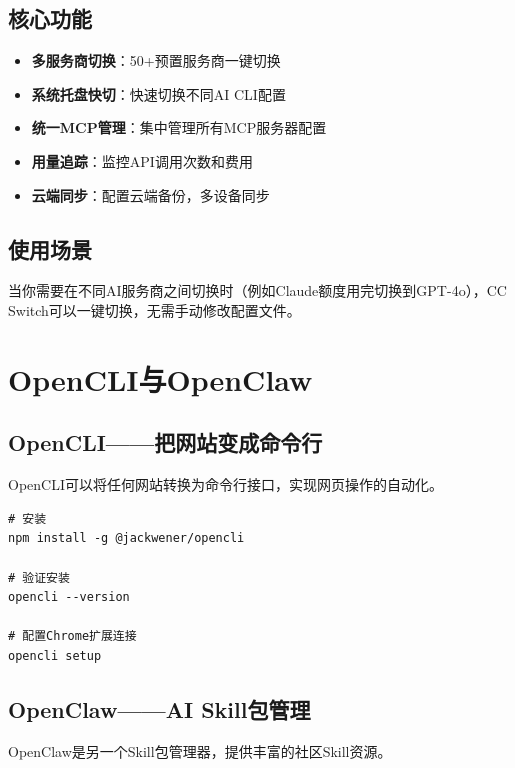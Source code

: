 \subsection{核心功能}

\begin{itemize}
  \item \textbf{多服务商切换}：50+预置服务商一键切换
  \item \textbf{系统托盘快切}：快速切换不同AI CLI配置
  \item \textbf{统一MCP管理}：集中管理所有MCP服务器配置
  \item \textbf{用量追踪}：监控API调用次数和费用
  \item \textbf{云端同步}：配置云端备份，多设备同步
\end{itemize}

\subsection{使用场景}

当你需要在不同AI服务商之间切换时（例如Claude额度用完切换到GPT-4o），CC Switch可以一键切换，无需手动修改配置文件。

\section{OpenCLI与OpenClaw}

\subsection{OpenCLI——把网站变成命令行}

OpenCLI可以将任何网站转换为命令行接口，实现网页操作的自动化。

\begin{lstlisting}[style=shell]
# 安装
npm install -g @jackwener/opencli

# 验证安装
opencli --version

# 配置Chrome扩展连接
opencli setup
\end{lstlisting}

\subsection{OpenClaw——AI Skill包管理}

OpenClaw是另一个Skill包管理器，提供丰富的社区Skill资源。

